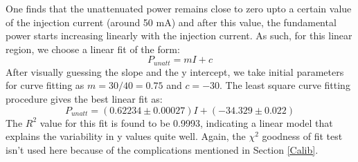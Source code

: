 One finds that the unattenuated power remains close to zero upto a certain value of the injection current (around 50 mA) and after this value, the fundamental power starts increasing linearly with the injection current. As such, for this linear region, we choose a linear fit of the form: 
\begin{equation}
P_{unatt}=mI+c
\end{equation}  
After visually guessing the slope and the y intercept, we take initial parameters for curve fitting as $m=30/40=0.75$ and $c=-30$. The least square curve fitting procedure gives the best linear fit as: 
\begin{equation}
P_{unatt}=(0.62234\pm 0.00027)I+(-34.329\pm 0.022)
\end{equation}
The $R^{2}$ value for this fit is found to be 0.9993, indicating a linear model that explains the variability in y values quite well. Again, the $\chi^{2}$ goodness of fit test isn't used here because of the complications mentioned in Section \ref{Calib}.

